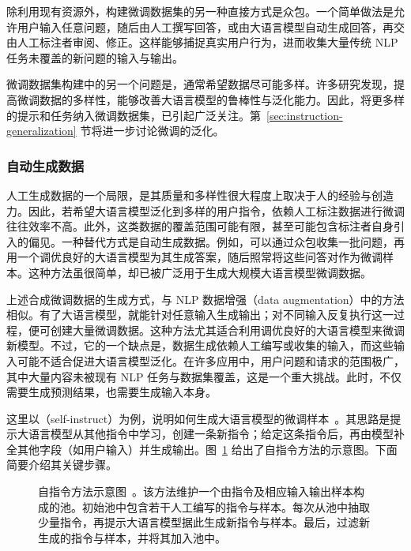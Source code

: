 除利用现有资源外，构建微调数据集的另一种直接方式是众包。一个简单做法是允许用户输入任意问题，随后由人工撰写回答，或由大语言模型自动生成回答，再交由人工标注者审阅、修正。这样能够捕捉真实用户行为，进而收集大量传统 NLP 任务未覆盖的新问题的输入与输出。

微调数据集构建中的另一个问题是，通常希望数据尽可能多样。许多研究发现，提高微调数据的多样性，能够改善大语言模型的鲁棒性与泛化能力。因此，将更多样的提示和任务纳入微调数据集，已引起广泛关注。第~\ref{sec:instruction-generalization} 节将进一步讨论微调的泛化。

\subsubsection{自动生成数据}

\noindent 人工生成数据的一个局限，是其质量和多样性很大程度上取决于人的经验与创造力。因此，若希望大语言模型泛化到多样的用户指令，依赖人工标注数据进行微调往往效率不高。此外，这类数据的覆盖范围可能有限，甚至可能包含标注者自身引入的偏见。一种替代方式是自动生成数据。例如，可以通过众包收集一批问题，再用一个调优良好的大语言模型为其生成答案，随后照常将这些问答对作为微调样本。这种方法虽很简单，却已被广泛用于生成大规模大语言模型微调数据。

上述合成微调数据的生成方式，与 NLP 数据增强（data augmentation）中的方法相似。有了大语言模型，就能针对任意输入生成输出；对不同输入反复执行这一过程，便可创建大量微调数据。这种方法尤其适合利用调优良好的大语言模型来微调新模型。不过，它的一个缺点是，数据生成依赖人工编写或收集的输入，而这些输入可能不适合促进大语言模型泛化。在许多应用中，用户问题和请求的范围极广，其中大量内容未被现有 NLP 任务与数据集覆盖，这是一个重大挑战。此时，不仅需要生成预测结果，也需要生成输入本身。

这里以（self-instruct）为例，说明如何生成大语言模型的微调样本~\cite{wang-etal:2023selfinstruct,honovich-etal:2023unnatural}。其思路是提示大语言模型从其他指令中学习，创建一条新指令；给定这条指令后，再由模型补全其他字段（如用户输入）并生成输出。图~\ref{fig:self-instruct} 给出了自指令方法的示意图。下面简要介绍其关键步骤。


\begin{figure}[!t]
\centering

\caption{自指令方法示意图~\cite{wang-etal:2023self}。该方法维护一个由指令及相应输入输出样本构成的池。初始池中包含若干人工编写的指令与样本。每次从池中抽取少量指令，再提示大语言模型据此生成新指令与样本。最后，过滤新生成的指令与样本，并将其加入池中。}
\label{fig:self-instruct}
\end{figure}


